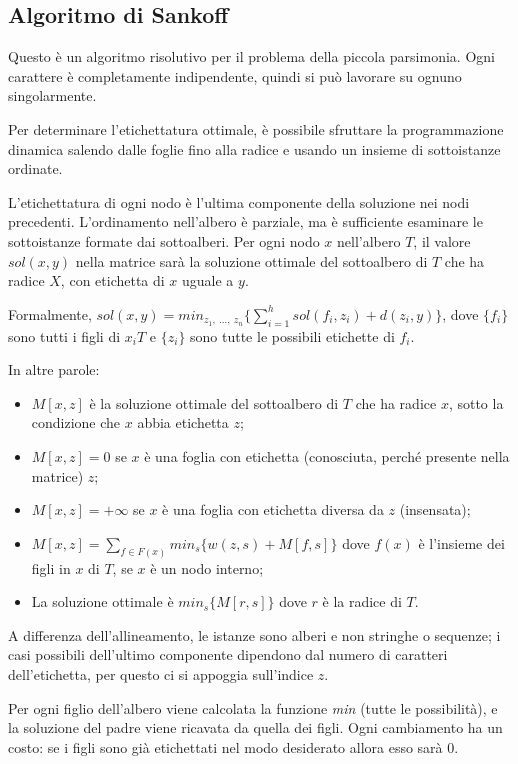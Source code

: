 \subsection{Algoritmo di Sankoff}
Questo è un algoritmo risolutivo per il problema della piccola parsimonia. Ogni carattere è completamente indipendente, quindi si può lavorare su ognuno singolarmente. 

Per determinare l'etichettatura ottimale, è possibile sfruttare la programmazione dinamica salendo dalle foglie fino alla radice e usando un insieme di sottoistanze ordinate.

L'etichettatura di ogni nodo è l'ultima componente della soluzione nei nodi precedenti. L'ordinamento nell'albero è parziale, ma è sufficiente esaminare le sottoistanze formate dai sottoalberi. Per ogni nodo $x$ nell'albero $T$, il valore $sol(x, y)$ nella matrice sarà la soluzione ottimale del sottoalbero di $T$ che ha radice $X$, con etichetta di $x$ uguale a $y$. 

Formalmente, $sol(x, y) = min_{z_1,\ \dots,\ z_n} \{\sum_{i=1}^{h} sol(f_i, z_i) + d(z_i, y)\}$, dove $\{f_i\}$ sono tutti i figli di $x_iT$ e $\{z_i\}$ sono tutte le possibili etichette di $f_i$.

In altre parole:
\begin{itemize}
	\item $M[x, z]$ è la soluzione ottimale del sottoalbero di $T$ che ha radice $x$, sotto la condizione che $x$ abbia etichetta $z$;
	\item $M[x, z] = 0$ se $x$ è una foglia con etichetta (conosciuta, perché presente nella matrice) $z$;
	\item $M[x, z] = +\infty$ se $x$ è una foglia con etichetta diversa da $z$ (insensata);
	\item $M[x, z] = \sum_{f \in F(x)} min_s \{w(z, s) + M[f, s]\}$ dove $f(x)$ è l'insieme dei figli in $x$ di $T$, se $x$ è un nodo interno;
	\item La soluzione ottimale è $min_s\{M[r, s]\}$ dove $r$ è la radice di $T$.
\end{itemize}

A differenza dell'allineamento, le istanze sono alberi e non stringhe o sequenze; i casi possibili dell'ultimo componente dipendono dal numero di caratteri dell'etichetta, per questo ci si appoggia sull'indice $z$.

Per ogni figlio dell'albero viene calcolata la funzione \textit{min} (tutte le possibilità), e la soluzione del padre viene ricavata da quella dei figli. Ogni cambiamento ha un costo: se i figli sono già etichettati nel modo desiderato allora esso sarà 0.

